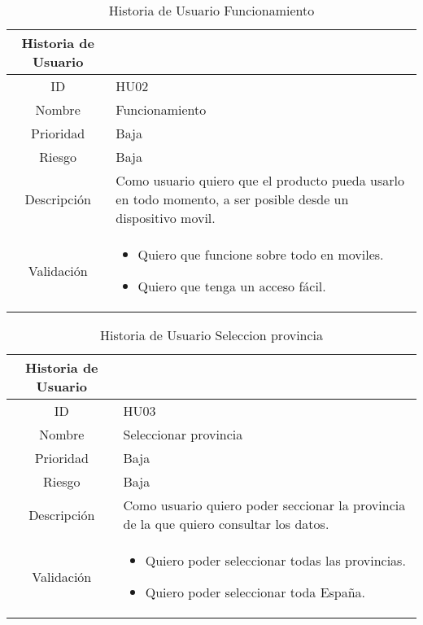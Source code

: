 \begin{table}[h]
	\begin{center}
		\begin{tabular}{| c | p{9cm} |}
			\hline
			
			Historia de Usuario &  \\ \hline
			
			
			ID & HU02 \\
			Nombre & Funcionamiento \\
			Prioridad & Baja \\
			Riesgo & Baja \\
			Descripción & Como usuario quiero que el producto pueda usarlo en todo momento, a ser posible desde un dispositivo movil. \\
			Validación & \begin{itemize}
				\item Quiero que funcione sobre todo en moviles.
				\item Quiero que tenga un acceso fácil.
			\end{itemize} \\ \hline
		\end{tabular}
		\caption{Historia de Usuario Funcionamiento}
		\label{tab:historia-usuario-02}
	\end{center}
\end{table}

\begin{table}[h]
	\begin{center}
		\begin{tabular}{| c | p{9cm} |}
			\hline
			
			Historia de Usuario &  \\ \hline
			
			
			ID & HU03 \\
			Nombre & Seleccionar provincia \\
			Prioridad & Baja \\
			Riesgo & Baja \\
			Descripción & Como usuario quiero poder seccionar la provincia de la que quiero consultar los datos. \\
			Validación & \begin{itemize}
				\item Quiero poder seleccionar todas las provincias.
				\item Quiero poder seleccionar toda España.
			\end{itemize} \\ \hline
		\end{tabular}
		\caption{Historia de Usuario Seleccion provincia}
		\label{tab:historia-usuario-03}
	\end{center}
\end{table}

